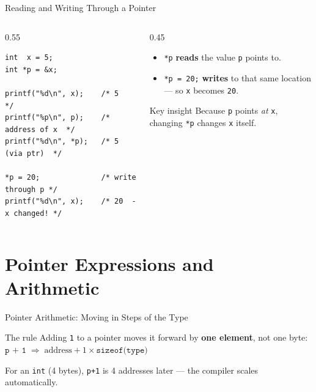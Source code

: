 \documentclass[aspectratio=169]{beamer}
\begin{document}
	\begin{frame}[fragile]{Reading and Writing Through a Pointer}
		\begin{columns}[T]
			\begin{column}{0.55\textwidth}
				\begin{lstlisting}
int  x = 5;
int *p = &x;

printf("%d\n", x);    /* 5             */
printf("%p\n", p);    /* address of x  */
printf("%d\n", *p);   /* 5  (via ptr)  */

*p = 20;              /* write through p */
printf("%d\n", x);    /* 20  - x changed! */
				\end{lstlisting}
			\end{column}
			\begin{column}{0.45\textwidth}
				\begin{itemize}\small
					\item \texttt{*p} \textbf{reads} the value \texttt{p} points to.
					\item \texttt{*p = 20;} \textbf{writes} to that same location --- so \texttt{x} becomes \texttt{20}.
				\end{itemize}
				\begin{block}{Key insight}
					\small Because \texttt{p} points \emph{at} \texttt{x}, changing \texttt{*p} changes \texttt{x} itself.
				\end{block}
			\end{column}
		\end{columns}
	\end{frame}

	\section{Pointer Expressions and Arithmetic}
	\begin{frame}{Pointer Arithmetic: Moving in Steps of the Type}
		\begin{block}{The rule}
			Adding \texttt{1} to a pointer moves it forward by \textbf{one element}, not one byte:
			\centering $\texttt{p + 1} \;\Rightarrow\; \text{address} + 1 \times \texttt{sizeof(type)}$
		\end{block}
		\vspace{0.1cm}
		\centering
		\vspace{0.15cm}
		\centering\footnotesize For an \texttt{int} (4 bytes), \texttt{p+1} is 4 addresses later --- the compiler scales automatically.
	\end{frame}
\end{document}
